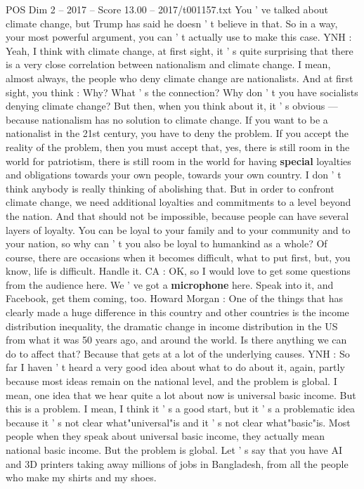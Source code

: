 \begin{textsample}{POS Dim 2 – 2017 – Score 13.00 – 2017/t001157.txt}
You ' ve talked about climate change, but Trump has said he doesn ' t believe in that.
So in a way, your most powerful argument, you can ' t actually use to make this case.
YNH : Yeah, I think with climate change, at first sight, it ' s quite surprising that there is a very close correlation between nationalism and climate change.
I mean, almost always, the people who deny climate change are nationalists.
And at first sight, you think : Why?
What ' s the connection?
Why don ' t you have socialists denying climate change?
But then, when you think about it, it ' s obvious — because nationalism has no solution to climate change.
If you want to be a nationalist in the 21st century, you have to deny the problem.
If you accept the reality of the problem, then you must accept that, yes, there is still room in the world for patriotism, there is still room in the world for having \textbf{special} loyalties and obligations towards your own people, towards your own country.
I don ' t think anybody is really thinking of abolishing that.
But in order to confront climate change, we need additional loyalties and commitments to a level beyond the nation.
And that should not be impossible, because people can have several layers of loyalty.
You can be loyal to your family and to your community and to your nation, so why can ' t you also be loyal to humankind as a whole?
Of course, there are occasions when it becomes difficult, what to put first, but, you know, life is difficult.
Handle it.
CA : OK, so I would love to get some questions from the audience here.
We ' ve got a \textbf{microphone} here.
Speak into it, and Facebook, get them coming, too.
Howard Morgan : One of the things that has clearly made a huge difference in this country and other countries is the income distribution inequality, the dramatic change in income distribution in the US from what it was 50 years ago, and around the world.
Is there anything we can do to affect that?
Because that gets at a lot of the underlying causes.
YNH : So far I haven ' t heard a very good idea about what to do about it, again, partly because most ideas remain on the national level, and the problem is global.
I mean, one idea that we hear quite a lot about now is universal basic income.
But this is a problem.
I mean, I think it ' s a good start, but it ' s a problematic idea because it ' s not clear what"universal"is and it ' s not clear what"basic"is.
Most people when they speak about universal basic income, they actually mean national basic income.
But the problem is global.
Let ' s say that you have AI and 3D printers taking away millions of jobs in Bangladesh, from all the people who make my shirts and my shoes.

\end{textsample}
